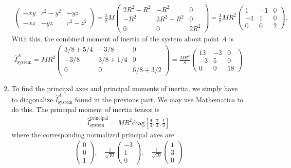 \documentclass{article}
\theoremstyle{definition}
\newcommand{\f}[2]{\frac{#1}{#2}}
\newcommand{\lb}{\left[}
\newcommand{\rb}{\right]}
\begin{document}
\begin{enumerate}[label=(\alph*)]
\begin{align*}
\begin{pmatrix}
	-xy & r^2 - y^2& -yz\\
	-xz &  -yz & r^2 - z^2
	\end{pmatrix} = \f{3}{8}M\begin{pmatrix}
	2R^2-R^2 & -R^2 & 0\\
	-R^2 & 2R^2 - R^2& 0\\
	0 &  0 & 2R^2
	\end{pmatrix} = \f{3}{8}MR^2\begin{pmatrix}
	1 & -1 & 0\\
	-1 & 1& 0\\
	0 &  0 & 2
	\end{pmatrix}.
	\end{align*}
	With this, the combined moment of inertia of the system about point $A$ is 
	\begin{align*}
	\hat{I}^A_\text{system} = MR^2
	\begin{pmatrix}
	3/8+5/4& -3/8& 0 \\
	-3/8 & 3/8+1/4& 0 \\
	0 & 0 &  6/8+ 3/2
	\end{pmatrix} = 
	\boxed{\f{MR^2}{8}
	\begin{pmatrix}
	13& -3& 0 \\
	-3 & 5& 0 \\
	0 & 0 &  18
	\end{pmatrix}}
	\end{align*}
	
	
	\item To find the principal axes and principal moments of inertia, we simply have to diagonalize $\hat I^A_\text{system}$ found in the previous part. We may use Mathematica to do this. The principal moment of inertia tensor is  
	\begin{align*}
	\boxed{\hat I_\text{system}^\text{principal} = MR^2 \text{diag}\lb \f{9}{4}, \f{7}{4}, \f{1}{2} \rb}
	\end{align*}
	where the corresponding normalized principal axes are
	\begin{align*}
	\boxed{\begin{pmatrix}
	0 \\ 0 \\ 1
	\end{pmatrix}, \quad \f{1}{\sqrt{10}}\begin{pmatrix}
	-3 \\ 1 \\ 0
	\end{pmatrix}, \quad 
	\f{1}{\sqrt{10}}\begin{pmatrix}
	1 \\ 3 \\ 0
	\end{pmatrix}}
	\end{align*}
	

\end{enumerate}
\end{document}
